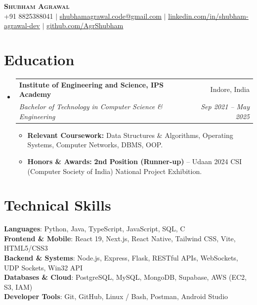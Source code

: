 \documentclass[letterpaper,11pt]{article}
\makeatletter
\newcommand{\resumeItem}[1]{
  \item\small{
    {#1 \vspace{-2pt}}
  }
}
\newcommand{\resumeSubheading}[4]{
  \vspace{-2pt}\item
    \begin{tabular*}{0.97\textwidth}[t]{l@{\extracolsep{\fill}}r}
      \textbf{#1} & #2 \\
      \textit{\small#3} & \textit{\small #4} \\
    \end{tabular*}\vspace{-7pt}
}
\newcommand{\resumeSubHeadingListStart}{\begin{itemize}[leftmargin=0.15in, label={}]}
\newcommand{\resumeSubHeadingListEnd}{\end{itemize}}
\newcommand{\resumeItemListStart}{\begin{itemize}}
\newcommand{\resumeItemListEnd}{\end{itemize}\vspace{-5pt}}
\makeatother
\begin{document}
\begin{center}
    \textbf{\Huge \scshape Shubham Agrawal} \\ \vspace{2pt}
    \small +91 8825388041 $|$ \href{mailto:shubhamagrawal.code@gmail.com}{\underline{shubhamagrawal.code@gmail.com}} $|$ 
    \href{https://linkedin.com/in/shubham-agrawal-dev}{\underline{linkedin.com/in/shubham-agrawal-dev}} $|$
    \href{https://github.com/AgrShubham}{\underline{github.com/AgrShubham}}
\end{center}

\section{Education}
  \resumeSubHeadingListStart
    \resumeSubheading
      {Institute of Engineering and Science, IPS Academy}{Indore, India}
      {Bachelor of Technology in Computer Science \& Engineering}{Sep 2021 -- May 2025}
      \resumeItemListStart
        \resumeItem{\textbf{Relevant Coursework:} Data Structures \& Algorithms, Operating Systems, Computer Networks, DBMS, OOP.}
        \resumeItem{\textbf{Honors \& Awards:} \textbf{2nd Position (Runner-up)} -- Udaan 2024 CSI (Computer Society of India) National Project Exhibition.}
      \resumeItemListEnd
  \resumeSubHeadingListEnd

\section{Technical Skills}
 \begin{itemize}[leftmargin=0.15in, label={}]
    \small{\item{
     \textbf{Languages}{: Python, Java, TypeScript, JavaScript, SQL, C} \\
     \textbf{Frontend \& Mobile}{: React 19, Next.js, React Native, Tailwind CSS, Vite, HTML5/CSS3} \\
     \textbf{Backend \& Systems}{: Node.js, Express, Flask, RESTful APIs, WebSockets, UDP Sockets, Win32 API} \\
     \textbf{Databases \& Cloud}{: PostgreSQL, MySQL, MongoDB, Supabase, AWS (EC2, S3, IAM)} \\
     \textbf{Developer Tools}{: Git, GitHub, Linux / Bash, Postman, Android Studio}
    }}
 \end{itemize}

\end{document}
